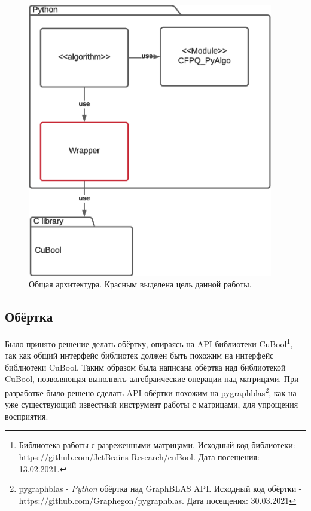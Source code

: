 \documentclass[14pt]{matmex-diploma}
\begin{document}
\begin{figure}[h]
    \centering
    \includegraphics[height=12cm]{pictures/arch.eps}
    \caption{Общая архитектура. Красным выделена цель данной работы.}\label{pic:projectArch}
\end{figure}

\subsection{Обёртка}
Было принято решение делать обёртку, опираясь на API библиотеки CuBool\footnote{
Библиотека работы с разреженными матрицами.
Исходный код библиотеки: https://github.com/JetBrains-Research/cuBool. Дата посещения: 13.02.2021.
}, так как общий интерфейс библиотек должен быть похожим на интерфейс библиотеки CuBool. 
Таким образом была написана обёртка над библиотекой CuBool,
позволяющая выполнять алгебраические операции над матрицами.
При разработке было решено сделать API обёртки похожим на pygraphblas\footnote{
pygraphblas - \textit{Python} обёртка над GraphBLAS API. 
Исходный код обёртки - https://github.com/Graphegon/pygraphblas. Дата посещения: 30.03.2021
},
как на уже существующий известный инструмент работы с матрицами, для упрощения восприятия.
\end{document}
